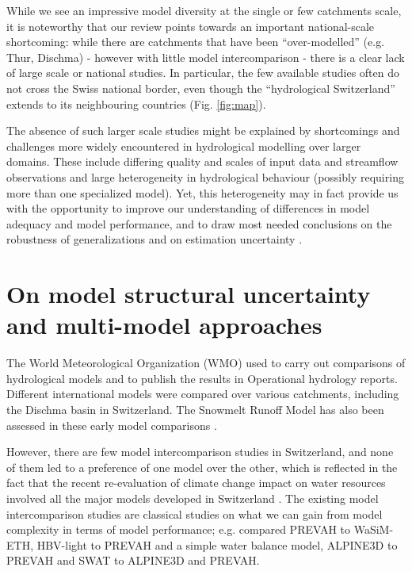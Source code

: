 \documentclass[10pt,a4paper]{article}
\begin{document}
While we see an impressive model diversity at the single or few catchments scale, it is noteworthy that our review points towards an important national-scale shortcoming: while there are catchments that have been ``over-modelled'' (e.g. Thur, Dischma) - however with little model intercomparison - there is a clear lack of large scale or national studies. In particular, the few available studies often do not cross the Swiss national border, even though the ``hydrological Switzerland'' extends to its neighbouring countries (Fig. \ref{fig:map}).

The absence of such larger scale studies might be explained by shortcomings and challenges more widely encountered in hydrological modelling over larger domains. These include differing quality and scales of input data and streamflow observations and large heterogeneity in hydrological behaviour (possibly requiring more than one specialized model). Yet, this heterogeneity may in fact provide us with the opportunity to improve our understanding of differences in model adequacy and model performance, and to draw most needed conclusions on the robustness of generalizations and on estimation uncertainty \citep{Gupta_2014,McMillan_2016}.


\section{On model structural uncertainty and multi-model approaches}
\label{sec:multi-model}

The World Meteorological Organization (WMO) used to carry out comparisons of hydrological models and to publish the results in Operational hydrology reports. Different international models were compared over various catchments, including the Dischma basin in Switzerland. The Snowmelt Runoff Model \citep[SRM,][see supplementary material]{martinec1975} has also been assessed in these early model comparisons \citep{WMO1986, WMO1992}.

However, there are few model intercomparison studies in Switzerland, and none of them led to a preference of one model over the other, which is reflected in the fact that the recent re-evaluation of climate change impact on water resources involved all the major models developed in Switzerland  \citep{bafu2021}. The existing model intercomparison studies are classical studies on what we can gain from model complexity in terms of model performance; e.g. \citet{Gurtz2003} compared PREVAH to WaSiM-ETH, \citet{Orth2015} HBV-light to PREVAH and a simple water balance model, \citet{Kobierska_2013} ALPINE3D to PREVAH and \citet{Andrianaki2019} SWAT to ALPINE3D and PREVAH.
\end{document}

